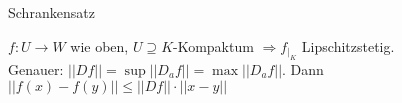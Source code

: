 \documentclass[class=article, crop=false]{standalone}
\begin{document}
\begin{zettel}{Schrankensatz}
\begin{flashcard}[]{}
	\begin{theorem}[Schrankensatz]
		$f: U \to W$ wie oben,  $U\supseteq K$-Kompaktum $\Rightarrow f _{\big | _{K} } $ Lipschitzstetig. \\
		Genauer: $|| Df || = \sup || D_af || = \max || D_af || .$ Dann $|| f(x) - f(y) || \leq || Df || \cdot || x - y ||  $
	\end{theorem}
\end{flashcard}
\end{zettel}
\end{document}
